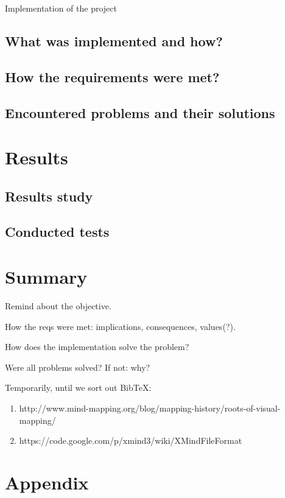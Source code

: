 \documentclass[american]{bsc}
\begin{document}
Implementation of the project

\section{What was implemented and how?}
\label{implwhat}

\section{How the requirements were met?}
\label{implrequirements}

\section{Encountered problems and their solutions}
\label{implproblems}

\chapter{Results}
\label{chap:results}

\section{Results study}
\label{sec:resstudy}

\section{Conducted tests}
\label{sec:tests}

\chapter{Summary}
\label{chap:summary}

Remind about the objective.

How the reqs were met: implications, consequences, values(?).

How does the implementation solve the problem?

Were all problems solved? If not: why?




Temporarily, until we sort out BibTeX:

\begin{enumerate}
	\item http://www.mind-mapping.org/blog/mapping-history/roots-of-visual-mapping/
	\item https://code.google.com/p/xmind3/wiki/XMindFileFormat
\end{enumerate}

\appendix

\chapter{Appendix}
\label{chap:appendix}
\end{document}
